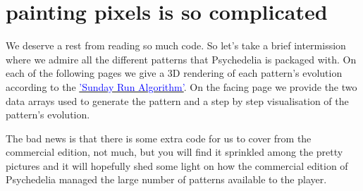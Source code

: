\chapter{painting pixels is so complicated} 
\label{sec:patterns}
\rhead[]{\leftmark}
\lstset{style=6502Style}

We deserve a rest from reading so much code. So let's take a brief intermission where
we admire all the different patterns that Psychedelia is packaged with. On each of the following
pages we give a 3D rendering of each pattern's evolution according to the
\hyperref[sec:listing_pattern]{\textcolor{blue}{'Sunday Run Algorithm'}}.
On the facing page we provide the two data arrays used to generate the pattern and a step by step
visualisation of the pattern's evolution.

The bad news is that there is some extra code for us to cover from the commercial edition, not much,
but you will find it sprinkled among the pretty pictures and it will hopefully shed some light
on how the commercial edition of Psychedelia managed the large number of patterns available to the
player.

